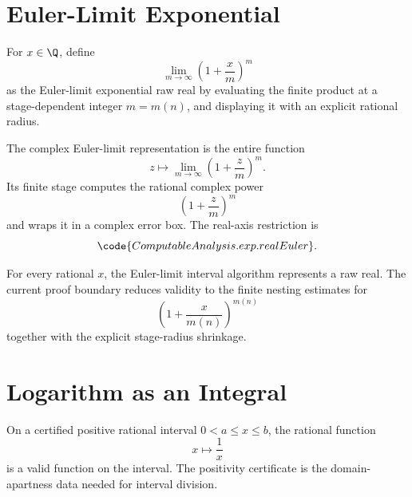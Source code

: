 \section{Euler-Limit Exponential}

\begin{definition}\label{def:exp-euler-real}
\leanok
For \(x\in\Q\), define
\[
  \lim_{m\to\infty}\left(1+\frac{x}{m}\right)^m
\]
as the Euler-limit exponential raw real by evaluating the finite product at
a stage-dependent integer \(m=m(n)\), and displaying it with an explicit
rational radius.
\end{definition}

\begin{definition}\label{def:exp-euler-function}
\leanok
The complex Euler-limit representation is the entire function
\[
  z\longmapsto \lim_{m\to\infty}\left(1+\frac{z}{m}\right)^m.
\]
Its finite stage computes the rational complex power
\[
  \left(1+\frac{z}{m}\right)^m
\]
and wraps it in a complex error box.  The real-axis restriction is
\[
  \code{ComputableAnalysis.exp.realEuler}.
\]
\end{definition}

\begin{theorem}\label{thm:exp-euler-valid}
For every rational \(x\), the Euler-limit interval algorithm represents a
raw real.  The current proof boundary reduces validity to the finite
nesting estimates for
\[
  \left(1+\frac{x}{m(n)}\right)^{m(n)}
\]
together with the explicit stage-radius shrinkage.
\end{theorem}

\section{Logarithm as an Integral}

\begin{definition}\label{def:positive-reciprocal-kernel}
\leanok
On a certified positive rational interval \(0<a\le x\le b\), the rational
function
\[
  x\longmapsto \frac1x
\]
is a valid function on the interval.  The positivity certificate is the
domain-apartness data needed for interval division.
\end{definition}

